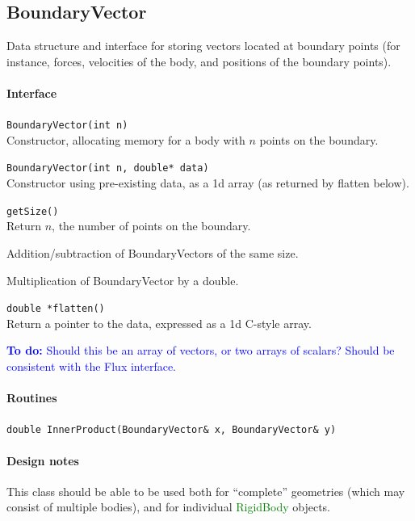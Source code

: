 \documentclass[11pt]{article}
\def\todo#1{\textcolor{blue}{{\bf To do:} #1}}
\def\class#1{\textcolor{green}{\ttfamily\small #1}} %
\def\fn#1{{\ttfamily\small #1}} %
\let\code\lstinline
\begin{document}
\subsection{BoundaryVector}
Data structure and interface for storing vectors located at boundary points (for instance, forces, velocities of the body, and positions of the boundary points).

\paragraph{Interface}
\begin{description}
	\item \code|BoundaryVector(int n)| \\
	Constructor, allocating memory for a body with $n$ points on the boundary.
	\item \code|BoundaryVector(int n, double* data)| \\
	Constructor using pre-existing data, as a 1d array (as returned by \fn{flatten} below).
	\item \code|getSize()| \\
	Return $n$, the number of points on the boundary.
	\item Addition/subtraction of BoundaryVectors of the same size.
	\item Multiplication of BoundaryVector by a double.
	\item \code|double *flatten()|\\
	Return a pointer to the data, expressed as a 1d C-style array.
\end{description}

\todo{Should this be an array of vectors, or two arrays of scalars?  Should be consistent with the Flux interface.}

\paragraph{Routines}
\begin{description}
	\item \code|double InnerProduct(BoundaryVector& x, BoundaryVector& y)|
\end{description}

\paragraph{Design notes}
This class should be able to be used both for ``complete'' geometries (which may consist of multiple bodies), and for individual \class{RigidBody} objects.
\end{document}
